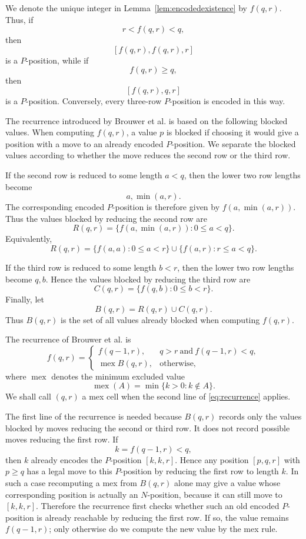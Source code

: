 \documentclass[11pt]{article}
\newcommand{\Mex}{\operatorname{mex}}
\begin{document}
We denote the unique integer in Lemma~\ref{lem:encodedexistence} by
$f(q,r)$. Thus, if
\[
        r<f(q,r)<q,
\]
then
\[
        [f(q,r),f(q,r),r]
\]
is a $P$-position, while if
\[
        f(q,r)\ge q,
\]
then
\[
        [f(q,r),q,r]
\]
is a $P$-position. Conversely, every three-row $P$-position is encoded in
this way.

The recurrence introduced by Brouwer et al. \cite{BrouwerEtAl2005} is based
on the following blocked values. When computing $f(q,r)$, a value
$p$ is blocked if choosing it would give a position with a move to an already
encoded $P$-position. We separate the blocked values according to whether
the move reduces the second row or the third row.

If the second row is reduced to some length $a<q$, then the lower two row
lengths become
\[
        a,\min(a,r).
\]
The corresponding encoded $P$-position is therefore given by
$f(a,\min(a,r))$. Thus the values blocked by reducing the second row are
\[
        R(q,r)=\{f(a,\min(a,r)):0\le a<q\}.
\]
Equivalently,
\[
        R(q,r)=
        \{f(a,a):0\le a<r\}\cup\{f(a,r):r\le a<q\}.
\]

If the third row is reduced to some length $b<r$, then the lower two row
lengths become $q,b$. Hence the values blocked by reducing the third row are
\[
        C(q,r)=\{f(q,b):0\le b<r\}.
\]
Finally, let
\[
        B(q,r)=R(q,r)\cup C(q,r).
\]
Thus $B(q,r)$ is the set of all values already blocked when computing
$f(q,r)$.


The recurrence of Brouwer et al. is
\begin{equation}\label{eq:recurrence}
 f(q,r)=
 \begin{cases}
   f(q-1,r), & q>r\ \text{and}\ f(q-1,r)<q,\\
   \Mex B(q,r), & \text{otherwise},
 \end{cases}
\end{equation}
where $\Mex$ denotes the minimum excluded value
\[
        \Mex(A)=\min\{k>0:k\notin A\}.
\]
We shall call $(q,r)$ a mex cell when the second line of
\eqref{eq:recurrence} applies.

The first line of the recurrence is needed because $B(q,r)$ records only
the values blocked by moves reducing the second or third row. It does not
record possible moves reducing the first row. If
\[
        k=f(q-1,r)<q,
\]
then $k$ already encodes the $P$-position $[k,k,r]$. Hence any position
$[p,q,r]$ with $p\ge q$ has a legal move to this $P$-position by reducing
the first row to length $k$. In such a case recomputing a mex from $B(q,r)$
alone may give a value whose corresponding position is actually an
$N$-position, because it can still move to $[k,k,r]$. Therefore the
recurrence first checks whether such an old encoded $P$-position is already
reachable by reducing the first row. If so, the value remains
$f(q-1,r)$; only otherwise do we compute the new value by the mex rule.
\end{document}
